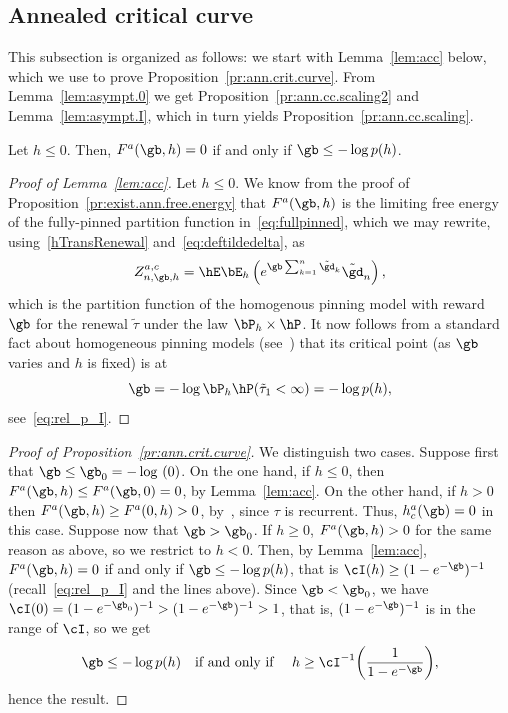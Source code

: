 \subsection{Annealed critical curve}\label{sec3.2}

This subsection is organized as follows: we start with Lemma~\ref{lem:acc} below, which we use to prove Proposition~\ref{pr:ann.crit.curve}. From Lemma~\ref{lem:asympt.0} we get Proposition~\ref{pr:ann.cc.scaling2} and Lemma~\ref{lem:asympt.I}, which in turn yields Proposition~\ref{pr:ann.cc.scaling}.

\begin{lemm}\label{lem:acc}
Let $h \leq 0$. Then, $F^a(\gb,h) = 0$ if and only if $\gb \leq - \log p(h)$.
\end{lemm}

\begin{proof}[Proof of Lemma~\ref{lem:acc}]
Let $h \leq 0$. We know from the proof of Proposition~\ref{pr:exist.ann.free.energy} that $F^a(\gb,h)$ is the limiting free energy of the fully-pinned partition function in~\eqref{eq:fullpinned}, which we may rewrite, using~\eqref{hTransRenewal} and~\eqref{eq:deftildedelta}, as
\begin{equation}\label{eq:equ.znac}
Z^{a,c}_{n,\gb,h} = \hE \bE_h \left(e^{\gb \sum_{k=1}^n \tilde \gd_k} \tilde \gd_n \right),
\end{equation}
which is the partition function of the homogenous pinning model with reward $\gb$ for the renewal $\tilde\tau$ under the law $\bP_h \times \hP$. It now follows from a standard fact about homogeneous pinning models (see~\cite[Section~1.2.2, Equation~(1.26)]{Gi2007}) that its critical point (as $\gb$ varies and $h$ is fixed) is at
\begin{equation}
\gb = - \log \bP_h \hP(\tilde \tau_1 < \infty) = - \log p(h),
\end{equation}
see~\eqref{eq:rel_p_I}.
\end{proof}

\begin{proof}[Proof of Proposition~\ref{pr:ann.crit.curve}]
We distinguish two cases. Suppose first that $\gb \leq \gb_0 = - \log~(0)$. On the one hand, if $h \leq 0$, then $F^a(\gb,h) \leq F^a(\gb,0) = 0$, by Lemma~\ref{lem:acc}. On the other hand, if $h > 0$ then $F^a(\gb,h) \geq F^a(0,h) > 0$, by~\cite[Theorem~2.7]{Gi2007}, since $\tau$ is recurrent. Thus, $h_c^a(\gb) = 0$ in this case. Suppose now that $\gb > \gb_0$. If $h \geq 0$, $F^a(\gb,h) > 0$ for the same reason as above, so we restrict to $h < 0$. Then, by Lemma~\ref{lem:acc}, $F^a(\gb,h) = 0$ if and only if $\gb \leq - \log p(h)$, that is $\cI(h) \geq (1 - e^{- \gb})^{-1}$ (recall~\eqref{eq:rel_p_I} and the lines above). Since $\gb < \gb_0$, we have $\cI(0)=(1 - e^{- \gb_0})^{-1}> (1 - e^{- \gb})^{-1} > 1$, that is, $(1 - e^{- \gb})^{-1}$ is in the range of $\cI$, so we get
\begin{equation}
\gb \leq - \log p(h) \quad \text{if and only if } \quad h \geq \cI^{-1} \bigg(\frac{1}{1 - e^{- \gb}} \bigg),
\end{equation}
hence the result.
\end{proof}

